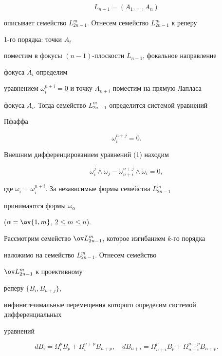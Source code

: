 $$ 


L_{n-1}=(A_1,\dotsc,A_n) 


$$ 


описывает семейство $L^m_{2n-1}$. Отнесем семейство $L^m_{2n-1}$ к реперу 


1-го порядка: точки $A_i$ 


поместим в фокусы $(n-1)$-плоскости $L_{n-1}$, фокальное направление 


фокуса $A_i$ определим 


уравнением $\omega_i^{n+i}=0$ и точку $A_{n+i}$ поместим на прямую Лапласа 


фокуса $A_i$. Тогда семейство $L^m_{2n-1}$ определится системой уравнений 


Пфаффа 


\begin{equation} 


\omega_i^{n+j}=0. 


\end{equation} 


Внешним дифференцированием уравнений (1) находим 


\begin{equation} 


\omega^j_i\wedge\omega_j-\omega^{n+j}_{n+i}\wedge\omega_i=0, 


\end{equation} 


где $\omega_i=\omega_i^{n+i}$. За независимые формы семейства $L^m_{2n-1}$ 


принимаются формы $\omega_\alpha$ 


($\alpha=\ov{1,m}$, $2\le m\le n$). 


 


Рассмотрим семейство $\ov L^m_{2n-1}$, которое изгибанием $k$-го порядка 


наложимо на семейство $L^m_{2n-1}$. Отнесем семейство 


$\ov L^m_{2n-1}$ к проективному 


реперу $\{B_i,B_{n+j}\}$, 


инфинитезимальные перемещения которого определим системой дифференциальных 


уравнений 


$$ 


dB_i=\Omega^p_iB_p+\Omega_i^{n+p}B_{n+p},\quad 


dB_{n+i}=\Omega^p_{n+i}B_p+\Omega^{n+p}_{n+i}B_{n+p}. 


$$ 


